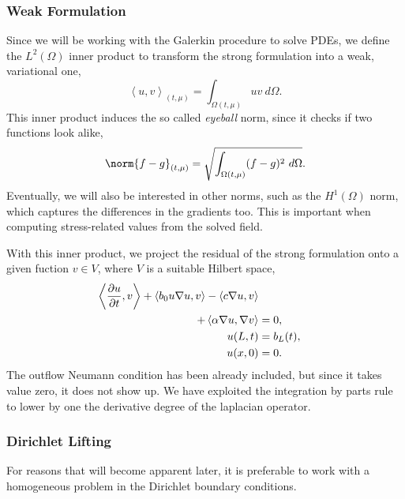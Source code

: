 \documentclass[../main.tex]{subfiles}
\newcommand{\inner}[2]{\left<#1, #2\right>}
\begin{document}
\subsubsection{Weak Formulation}
Since we will be working with the Galerkin procedure to solve PDEs, 
we define the $L^2(\Omega)$ inner product to transform the strong formulation into a weak, variational one,
\begin{equation}
    \inner{u}{v}_{(t, \mu)} = \int_{\Omega(t, \mu)} uv\ d\Omega.
\end{equation}
This inner product induces the so called \emph{eyeball} norm, since it checks if two functions look alike,
\begin{equation}
    \norm{f-g}_{(t, \mu)}  = \sqrt{\int_{\Omega(t, \mu)} (f - g)^2\ d\Omega}.
\end{equation}
Eventually, we will also be interested in other norms, such as the $H^1(\Omega)$ norm, which captures the differences in the gradients too.
This is important when computing stress-related values from the solved field.

With this inner product, we project the residual of the strong formulation onto a given fuction $v \in V$,
where $V$ is a suitable Hilbert space,
\begin{subequations}
    \begin{align}
        \label{eq:1d_fom_weak_formulation}
        \inner{\frac{\partial u}{\partial t}}{v} + \inner{b_0 u \grad u}{v} - \inner{c \grad u}{v} \nonumber \\ 
        + \inner{\alpha \grad u}{\grad v} &= 0,  \\
        u(L, t) &= b_L(t), \\
        u(x, 0) &= 0.
    \end{align}
\end{subequations}
The outflow Neumann condition has been already included, but since it takes value zero, it does not show up. 
We have exploited the integration by parts rule to lower by one the derivative degree of the laplacian operator.

\subsubsection{Dirichlet Lifting}
\label{sec:1d_fom_heat_equation_dirichlet_lifting}
For reasons that will become apparent later, it is preferable to work with a homogeneous problem in the Dirichlet boundary conditions.
\end{document}
